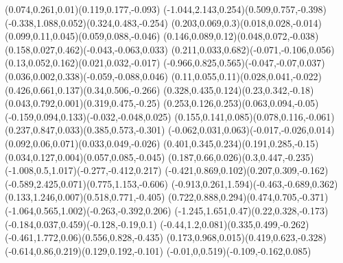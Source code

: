 \pstThreeDLine[linecolor=gray](0.074,0.261,0.01)(0.119,0.177,-0.093)
\pstThreeDLine[linecolor=gray](-1.044,2.143,0.254)(0.509,0.757,-0.398)
\pstThreeDLine[linecolor=gray](-0.338,1.088,0.052)(0.324,0.483,-0.254)
\pstThreeDLine[linecolor=gray](0.203,0.069,0.3)(0.018,0.028,-0.014)
\pstThreeDLine[linecolor=gray](0.099,0.11,0.045)(0.059,0.088,-0.046)
\pstThreeDLine[linecolor=gray](0.146,0.089,0.12)(0.048,0.072,-0.038)
\pstThreeDLine[linecolor=gray](0.158,0.027,0.462)(-0.043,-0.063,0.033)
\pstThreeDLine[linecolor=gray](0.211,0.033,0.682)(-0.071,-0.106,0.056)
\pstThreeDLine[linecolor=gray](0.13,0.052,0.162)(0.021,0.032,-0.017)
\pstThreeDLine[linecolor=gray](-0.966,0.825,0.565)(-0.047,-0.07,0.037)
\pstThreeDLine[linecolor=gray](0.036,0.002,0.338)(-0.059,-0.088,0.046)
\pstThreeDLine[linecolor=gray](0.11,0.055,0.11)(0.028,0.041,-0.022)
\pstThreeDLine[linecolor=gray](0.426,0.661,0.137)(0.34,0.506,-0.266)
\pstThreeDLine[linecolor=gray](0.328,0.435,0.124)(0.23,0.342,-0.18)
\pstThreeDLine[linecolor=gray](0.043,0.792,0.001)(0.319,0.475,-0.25)
\pstThreeDLine[linecolor=gray](0.253,0.126,0.253)(0.063,0.094,-0.05)
\pstThreeDLine[linecolor=gray](-0.159,0.094,0.133)(-0.032,-0.048,0.025)
\pstThreeDLine[linecolor=gray](0.155,0.141,0.085)(0.078,0.116,-0.061)
\pstThreeDLine[linecolor=gray](0.237,0.847,0.033)(0.385,0.573,-0.301)
\pstThreeDLine[linecolor=gray](-0.062,0.031,0.063)(-0.017,-0.026,0.014)
\pstThreeDLine[linecolor=gray](0.092,0.06,0.071)(0.033,0.049,-0.026)
\pstThreeDLine[linecolor=gray](0.401,0.345,0.234)(0.191,0.285,-0.15)
\pstThreeDLine[linecolor=gray](0.034,0.127,0.004)(0.057,0.085,-0.045)
\pstThreeDLine[linecolor=gray](0.187,0.66,0.026)(0.3,0.447,-0.235)
\pstThreeDLine[linecolor=gray](-1.008,0.5,1.017)(-0.277,-0.412,0.217)
\pstThreeDLine[linecolor=gray](-0.421,0.869,0.102)(0.207,0.309,-0.162)
\pstThreeDLine[linecolor=gray](-0.589,2.425,0.071)(0.775,1.153,-0.606)
\pstThreeDLine[linecolor=gray](-0.913,0.261,1.594)(-0.463,-0.689,0.362)
\pstThreeDLine[linecolor=gray](0.133,1.246,0.007)(0.518,0.771,-0.405)
\pstThreeDLine[linecolor=gray](0.722,0.888,0.294)(0.474,0.705,-0.371)
\pstThreeDLine[linecolor=gray](-1.064,0.565,1.002)(-0.263,-0.392,0.206)
\pstThreeDLine[linecolor=gray](-1.245,1.651,0.47)(0.22,0.328,-0.173)
\pstThreeDLine[linecolor=gray](-0.184,0.037,0.459)(-0.128,-0.19,0.1)
\pstThreeDLine[linecolor=gray](-0.44,1.2,0.081)(0.335,0.499,-0.262)
\pstThreeDLine[linecolor=gray](-0.461,1.772,0.06)(0.556,0.828,-0.435)
\pstThreeDLine[linecolor=gray](0.173,0.968,0.015)(0.419,0.623,-0.328)
\pstThreeDLine[linecolor=gray](-0.614,0.86,0.219)(0.129,0.192,-0.101)
\pstThreeDLine[linecolor=gray](-0.01,0,0.519)(-0.109,-0.162,0.085)
